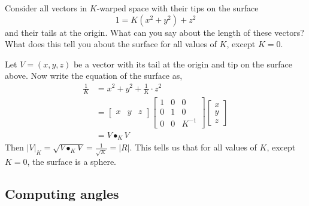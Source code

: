 \documentclass{ximera}
\begin{document}
\begin{problem}
  Consider all vectors in $K$-warped space with their tips on the
  surface
  \[
  1=K(x^2+y^2)+z^2
  \]
  and their tails at the origin. What can you say about the length of
  these vectors? What does this tell you about the surface for all values of $K$, except $K=0$.
  
\begin{freeResponse}
Let $V = \left(x,y,z\right)$ be a vector with its tail at the origin and tip on the surface above. Now write the equation of the surface as,
\begin{align*}
\frac{1}{K} &= x^{2} + y^{2} + \frac{1}{K} \cdot z^{2} \\
&= \begin{bmatrix}
	x & y & z
	\end{bmatrix}
\begin{bmatrix}
	1 & 0 & 0 \\
	0 & 1 & 0 \\
	0 & 0 & K^{-1}
	\end{bmatrix}
\begin{bmatrix}
	x \\
	y \\
	z
	\end{bmatrix}\\
&= V \bullet_{K} V
\end{align*}
Then $|V|_{K} = \sqrt{V \bullet_{K} V} = \frac{1}{\sqrt{K}} = |R|$. This tells us that for all values of $K$, except $K=0$, the surface is a sphere. 
\end{freeResponse}

\end{problem}



\subsection{Computing angles}
\end{document}
